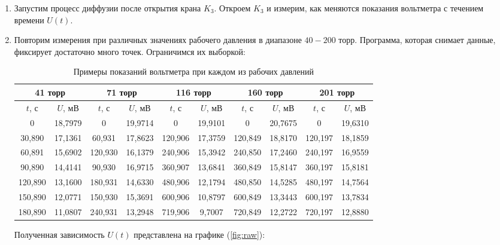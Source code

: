 \documentclass[a4paper,12pt]{article} %
\begin{document}
\begin{enumerate}
  \item Запустим процесс диффузии после открытия крана $K_3$. Откроем $K_3$ и измерим, как меняются показания вольтметра с течением времени $U(t)$. 
  
  \item Повторим измерения при различных значениях рабочего давления в диапазоне $40-200$ торр. Программа, которая снимает данные, фиксирует достаточно много точек. Ограничимся их выборкой:

  \begin{table}[h!]
    \centering
    \begin{tabular}{|c|c|c|c|c|c|c|c|c|c|}
      \hline
      \multicolumn{2}{|c|}{41 торр} & \multicolumn{2}{c|}{71 торр} & \multicolumn{2}{c|}{116 торр} & \multicolumn{2}{c|}{160 торр} & \multicolumn{2}{c|}{201 торр} \\ \hline
      $t$, с & $U$, мВ & $t$, с & $U$, мВ & $t$, с & $U$, мВ & $t$, с & $U$, мВ & $t$, с & $U$, мВ \\ 
      \hline 
      0      & 18,7979 & 0     & 19,9714 & 0        & 19,9101 & 0      & 20,7675 & 0 & 19,6310 \\
      30,890 & 17,1361 & 60,931 & 17,8623 & 120,906 & 17,3759 & 120,849 & 18,8170 & 120,197 & 18,1859 \\
      60,891 & 15,6902 & 120,930 & 16,1379 & 240,906 & 15,3942 & 240,850 & 17,2460 & 240,197 & 16,9559 \\
      90,890 & 14,4141 & 90,930 & 16,9715 & 360,907 & 13,6841 & 360,849 & 15,8147 & 360,197 & 15,8181 \\
      120,890 & 13,1600 & 180,931 & 14,6330 & 480,906 & 12,1794 & 480,850 & 14,5285 & 480,197 & 14,7564 \\
      150,890 & 12,0771 & 150,930 & 15,3691 & 600,906 & 10,8797 & 600,849 & 13,3443 & 600,197 & 13,7834 \\
      180,890 & 11,0807 & 240,931 & 13,2948 & 719,906 & 9,7007 & 720,849 & 12,2722 & 720,197 & 12,8880 \\
      \hline  
    \end{tabular}
    \caption{Примеры показаний вольтметра при каждом из рабочих давлений}
    \label{tab:example}
  \end{table}
  
  Полученная зависимость $U(t)$ представлена на графике (\ref{fig:raw}):
  

\end{enumerate}
\end{document}

